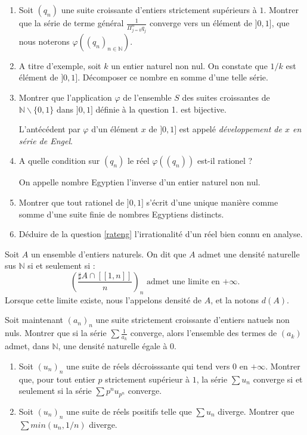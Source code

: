 \begin{exer}
\begin{enumerate}
\item Soit $(q_n)$ une suite croissante d'entiers strictement supérieurs à $1$. %
Montrer que la série de terme général $\frac{1}{\Pi_{j=0}^n q_j}$ converge vers un élément de $]0,1]$, %
que nous noterons $\varphi ((q_n)_{n \in \mathbb{N}})$.
\item A titre d'exemple, soit $k$ un entier naturel non nul. On constate que $1/k$ est élément de $]0,1]$. %
Décomposer ce nombre en somme d'une telle série.
\item Montrer que l'application $\varphi$ de l'ensemble $S$ des suites croissantes de %
$\mathbb{N} \backslash \{0,1\}$ dans $]0,1]$ définie à la question 1. est bijective.

L'antécédent par $\varphi$ d'un élément $x$ de $]0,1]$ est appelé \textit{développement de $x$ en série de Engel}.
\item\label{rateng} A quelle condition sur $(q_n)$ le réel $\varphi ((q_n))$ est-il rationel ?

On appelle nombre Egyptien l'inverse d'un entier naturel non nul.
\item Montrer que tout rationel de $]0,1]$ s'écrit d'une unique manière comme somme d'une suite finie de nombres Egyptiens distincts.
\item Déduire de la question \ref{rateng} l'irrationalité d'un réel bien connu en analyse.
\end{enumerate}
\end{exer}

\begin{exer}
Soit $A$ un ensemble d'entiers naturels. On dit que $A$ admet une densité naturelle sus $\mathbb{N}$ si et seulement si :
\[\left(\frac{\sharp A \cap [\![1,n]\!]}{n}\right)_n\text{ admet une limite en $+ \infty$.}\]
Lorsque cette limite existe, nous l'appelons densité de $A$, et la notons $d(A)$.

Soit maintenant $(a_n)_n$ une suite strictement croissante d'entiers natuels non nuls. %
Montrer que si la série $\sum \frac{1}{a_k}$ converge, %
alors l'ensemble des termes de $(a_k)$ admet, dans $\mathbb{N}$, une densit\'e naturelle égale à $0$.
\end{exer}

\begin{exer}
\begin{enumerate}
\item Soit $(u_n)_n$ une suite de réels décroisssante qui tend vers $0$ en $+ \infty$. %
Montrer que, pour tout entier $p$ strictement supérieur à $1$, %
la série $\sum u_n$ converge si et seulement si la série $\sum p^n u_{p^n}$ converge.
\item Soit $(u_n)_n$ une suite de réels positifs telle que $\sum u_n$ diverge. %
Montrer que $\sum min(u_n,1/n)$ diverge.
\end{enumerate}
\end{exer}

